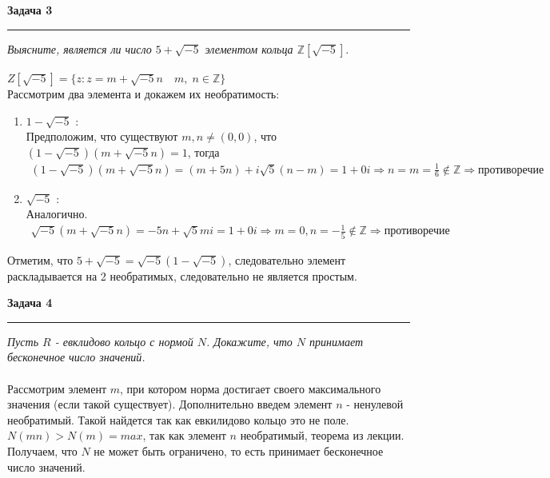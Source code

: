 \documentclass[a4paper,11pt]{article}
\begin{document}



\textbf{\large Задача 3}
\medskip\hrule\medskip
\textit{Выясните, является ли число $ 5 + \sqrt{-5} $ элементом кольца $ \mathbb{Z}[\sqrt{-5}]. $} \\ \\
$ Z[\sqrt{-5}] = \{ z : z = m + \sqrt{-5}n \quad m, \; n \in \mathbb{Z} \} $ \\
Рассмотрим два элемента и докажем их необратимость:
\begin{enumerate}
	\item $ 1 - \sqrt{-5} $ : \\
	Предположим, что существуют $ m, n \neq (0, 0) $, что $ (1 - \sqrt{-5})(m + \sqrt{-5}n) = 1 $, тогда
	\begin{gather*}		
	(1 - \sqrt{-5})(m + \sqrt{-5}n) = (m + 5n) + i\sqrt{5}(n - m) = 1 + 0i \Rightarrow n = m = \frac16  \notin \mathbb{Z} \Rightarrow \text{противоречие}
	\end{gather*}
	\item $ \sqrt{-5} $ : \\
	Аналогично.
	\begin{gather*}
		\sqrt{-5}( m + \sqrt{-5}n) = -5n + \sqrt{5}mi = 1 + 0i \Rightarrow m = 0, n = -\frac15 \notin \mathbb{Z} \Rightarrow \text{противоречие}
	\end{gather*}
\end{enumerate} 
Отметим, что $ 5 + \sqrt{-5} = \sqrt{-5}(1 - \sqrt{-5}) $, следовательно элемент раскладывается на 2 необратимых, следовательно не является простым. 
\newpage









\textbf{\large Задача 4}
\medskip\hrule\medskip
\textit{Пусть $ R $ - евклидово кольцо с нормой $ N $. Докажите, что $ N $ принимает бесконечное число значений.} \\ \\
Рассмотрим элемент $ m $, при котором норма достигает своего максимального значения (если такой существует). Дополнительно введем элемент $ n $ -  ненулевой необратимый. Такой найдется так как евкилидово кольцо это не поле. $ N(mn) > N(m) = max $, так как элемент $ n $ необратимый, теорема из лекции.
Получаем, что $ N $ не может быть ограничено, то есть принимает бесконечное число значений.
 
\end{document}
